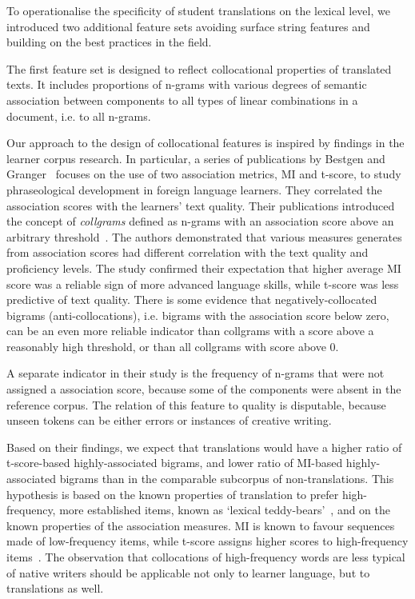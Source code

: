 To operationalise the specificity of student translations on the lexical level, we introduced two additional feature sets avoiding surface string features and building on the best practices in the field.  

The first feature set is designed to reflect collocational properties of translated texts. It includes proportions of n-grams with various degrees of semantic association between components to all types of linear combinations in a document, i.e. to all n-grams. 

Our approach to the design of collocational features is inspired by findings in the learner corpus research. In particular, a series of publications by Bestgen and Granger~\cite{Bestgen2014,Bestgen2017,Granger2017} focuses on the use of two association metrics, \gls{MI} and t-score, to study phraseological development in foreign language learners. They correlated the association scores with the learners' text quality. Their publications introduced the concept of \textit{collgrams} defined as n-grams with an association score above an arbitrary threshold~\cite{Bestgen2014}. The authors demonstrated that various measures generates from association scores had different correlation with the text quality and proficiency levels. The study confirmed their expectation that higher average MI score was a reliable sign of more advanced language skills, while t-score was less predictive of text quality. 
There is some evidence that negatively-collocated bigrams (anti-collocations), i.e. bigrams with the association score below zero, can be an even more reliable indicator than collgrams with a score above a reasonably high threshold, or than all collgrams with score above 0. 

A separate indicator in their study is the frequency of n-grams that were not assigned a association score, because some of the components were absent in the reference corpus. The relation of this feature to quality is disputable, because unseen tokens can be either errors or instances of creative writing. 

\label{pg:why_collocations}
Based on their findings, we expect that translations would have a higher ratio of t-score-based highly-associated bigrams, and lower ratio of MI-based highly-associated bigrams than in the comparable subcorpus of non-translations.
This hypothesis is based on the known properties of translation to prefer high-frequency, more established items, known as `lexical teddy-bears'~\cite[p.123]{Johansson2008}, and on the known properties of the association measures. MI is known to favour sequences made of low-frequency items, while t-score assigns higher scores to high-frequency items~\cite{Gries2010}. The observation that collocations of high-frequency words are less typical of native writers should be applicable not only to learner language, but to translations as well. 

